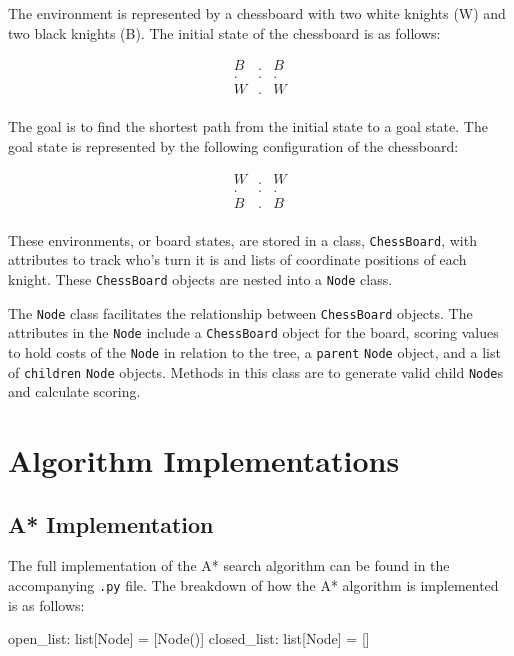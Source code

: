 \documentclass[12pt, letterpaper, final, onecolumn, titlepage] {article}
\begin{document}
\noindent The environment is represented by a chessboard with two white knights (W) and two black knights (B). The initial state of the chessboard is as follows:

\[
\begin{array}{ccc}
 B & . & B \\
 . & . & . \\
 W & . & W \\
\end{array}
\]

\noindent The goal is to find the shortest path from the initial state to a goal state. The goal state is represented by the following configuration of the chessboard:

\[
\begin{array}{ccc}
 W & . & W \\
 . & . & . \\
 B & . & B \\
\end{array}
\]

\noindent These environments, or board states, are stored in a class, \texttt{ChessBoard},  with attributes to track who's turn it is and lists of coordinate positions of each knight.  These \texttt{ChessBoard} objects are nested into a \texttt{Node} class.  

\noindent The \texttt{Node} class facilitates the relationship between \texttt{ChessBoard} objects.  The attributes in the \texttt{Node} include a \texttt{ChessBoard} object for the board, scoring values to hold costs of the \texttt{Node} in relation to the tree, a \texttt{parent} \texttt{Node} object, and a list of \texttt{children} \texttt{Node} objects.  Methods in this class are to generate valid child \texttt{Node}s and calculate scoring.
\newpage

\section{Algorithm Implementations}
\subsection{A* Implementation}
\noindent The full implementation of the A* search algorithm can be found in the accompanying \texttt{.py} file. The breakdown of how the A* algorithm is implemented is as follows:

\begin{python}
open_list: list[Node] = [Node()]
closed_list: list[Node] = []
\end{python}
\end{document}

